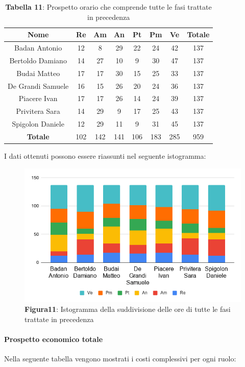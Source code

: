 \begin{table}[H]
	\centering
	\renewcommand{\arraystretch}{1.5}
	\begin{tabular}{|c|c|c|c|c|c|c|c|}
		\hline
		\rowcolor{lighter-grayer}
Nome & Re & Am & An & Pt & Pm & Ve & Totale \\ \hline
Badan Antonio & 12 & 8 & 29 & 22 & 24 & 42 & 137 \\ \hline
Bertoldo Damiano & 14 & 27 & 10 & 9 & 30 & 47 & 137 \\ \hline
Budai Matteo & 17 & 17 & 30 & 15 & 25 & 33 & 137 \\ \hline
De Grandi Samuele & 16 & 15 & 26 & 20 & 24 & 36 & 137 \\ \hline
Piacere Ivan & 17 & 17 & 26 & 14 & 24 & 39 & 137 \\ \hline
Privitera Sara & 14 & 29 & 9 & 17 & 25 & 43 & 137 \\ \hline
Spigolon Daniele & 12 & 29 & 11 & 9 & 31 & 45 & 137 \\ \hline
\textbf{Totale} & 102 & 142 & 141 & 106 & 183 & 285 & 959 \\ \hline
	\end{tabular}
	\caption*{\textbf{Tabella 11}: Prospetto orario che comprende tutte le fasi trattate in precedenza\\}
\end{table}	
I dati ottenuti possono essere riassunti nel seguente istogramma:

\begin{figure}[H]
	\centering
	\includegraphics[width=0.7\linewidth]{res/images/IstogrammaTotale.png}
	\caption*{\textbf{Figura11}: Istogramma della suddivisione delle ore di tutte le fasi trattate in precedenza}
	\label{fig:Figura10}
\end{figure}

\paragraph{Prospetto economico totale}
Nella seguente tabella vengono mostrati i costi complessivi per ogni ruolo:

